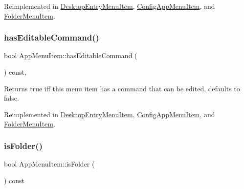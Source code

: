 Reimplemented in \mbox{\hyperlink{classDesktopEntryMenuItem_a6fcceaef6c50610d94fdec1f3f6e4dd5}{Desktop\+Entry\+Menu\+Item}}, \mbox{\hyperlink{classConfigAppMenuItem_a3fc7d1bbbe4b75e522f77d4efc688819}{Config\+App\+Menu\+Item}}, and \mbox{\hyperlink{classFolderMenuItem_aff205a81de032f9ce018d65391a8d638}{Folder\+Menu\+Item}}.

\mbox{\label{classAppMenuItem_a295fde428e713a8c891dc19b5048c373}} 
\subsubsection{\texorpdfstring{has\+Editable\+Command()}{hasEditableCommand()}}
{\footnotesize\ttfamily bool App\+Menu\+Item\+::has\+Editable\+Command (\begin{DoxyParamCaption}{ }\end{DoxyParamCaption}) const\hspace{0.3cm}{\ttfamily [protected]}, {\ttfamily [virtual]}}

\begin{DoxyReturn}{Returns}
true iff this menu item has a command that can be edited, defaults to false. 
\end{DoxyReturn}


Reimplemented in \mbox{\hyperlink{classDesktopEntryMenuItem_a60ed757bf4ebe33537b7204d005ecc78}{Desktop\+Entry\+Menu\+Item}}, \mbox{\hyperlink{classConfigAppMenuItem_a7c7b432e4c9e7aaf09f00c47b7f165d7}{Config\+App\+Menu\+Item}}, and \mbox{\hyperlink{classFolderMenuItem_ad38b52ffa7098be2aa8bef09b4013f0e}{Folder\+Menu\+Item}}.

\mbox{\label{classAppMenuItem_a8246d80e6cec284fa67a69eb8fa12354}} 
\subsubsection{\texorpdfstring{is\+Folder()}{isFolder()}}
{\footnotesize\ttfamily bool App\+Menu\+Item\+::is\+Folder (\begin{DoxyParamCaption}{ }\end{DoxyParamCaption}) const\hspace{0.3cm}{\ttfamily [virtual]}}

